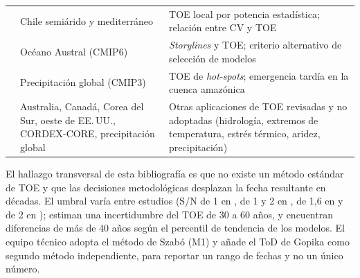 \begin{longtable}{@{}L{3.6cm}L{3.2cm}L{\dimexpr\textwidth-3.6cm-3.2cm-4\tabcolsep\relax}@{}}
\citet{chadwick2019} & Chile semiárido y mediterráneo & TOE local por potencia estadística; relación entre CV y TOE \\
\citet{lois2026} & Océano Austral (CMIP6) & \emph{Storylines} y TOE; criterio alternativo de selección de modelos \\
\citet{giorgi2009} & Precipitación global (CMIP3) & TOE de \emph{hot-spots}; emergencia tardía en la cuenca amazónica \\
\citet{john2023,deng2022,barrow2019,ryu2024,ryu2025,im2021,nguyen2018} & Australia, Canadá, Corea del Sur, oeste de EE.\,UU., CORDEX-CORE, precipitación global & Otras aplicaciones de TOE revisadas y no adoptadas (hidrología, extremos de temperatura, estrés térmico, aridez, precipitación) \\
\bottomrule
\end{longtable}

El hallazgo transversal de esta bibliografía es que no existe un método estándar de TOE y que las decisiones metodológicas desplazan la fecha resultante en décadas. El umbral varía entre estudios (S/N de 1 en \citealp{szabo2016}, de 1 y 2 en \citealp{hawkins2012}, de 1{,}6 en \citealp{gopika2024} y de 2 en \citealp{poul2025}); \citet{hawkins2012} estiman una incertidumbre del TOE de 30 a 60 años, y \citet{chadwick2019} encuentran diferencias de más de 40 años según el percentil de tendencia de los modelos. El equipo técnico adopta el método de Szabó (M1) y añade el ToD de Gopika como segundo método independiente, para reportar un rango de fechas y no un único número.
